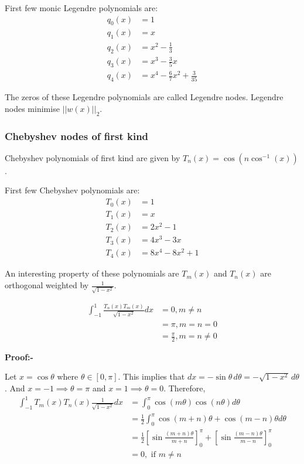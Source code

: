 \documentclass[
]{book}
\begin{document}
First few monic Legendre polynomials are:
\begin{align*}
  q_0(x) &= 1\\
  q_1(x) &= x\\
  q_2(x) &= x^2-\frac{1}{3}\\
  q_3(x) &= x^3-\frac{3}{5}x\\
  q_4(x) &= x^4- \frac{6}{7}x^2+\frac{3}{35}
\end{align*}

The zeros of these Legendre polynomials are called Legendre nodes. Legendre nodes minimise \(||w(x)||_2\).

\hypertarget{chebyshev-nodes-of-first-kind}{%
\subsubsection{Chebyshev nodes of first kind}\label{chebyshev-nodes-of-first-kind}}

Chebyshev polynomials of first kind are given by \(T_n(x) = \cos(n\cos^{-1}(x))\).

First few Chebyshev polynomials are:
\begin{align}
T_0(x) &= 1\\
T_1(x) &= x\\
T_2(x) &= 2x^2-1\\
T_3(x) &= 4x^3-3x\\
T_4(x) &= 8x^4-8x^2+1
\end{align}

An interesting property of these polynomials are \(T_m(x)\) and \(T_n(x)\) are orthogonal weighted by \(\frac{1}{\sqrt{1-x^2}}\).

\begin{align}
   \int_{-1}^{1}\frac{ T_n(x)T_m(x)}{\sqrt{1-x^2}}dx &= 0 , m \neq n\\
                                    &= \pi,m = n= 0\\
                                    &= \frac{\pi}{2}, m = n \neq 0               
\end{align}

\textbf{Proof:-}

Let \(x = \cos \theta\) where \(\theta \in [0,\pi]\). This implies that \(dx = -\sin \theta \, d \theta = -\sqrt{1-x^2} \, d \theta\). And \(x=-1 \implies \theta = \pi\) and \(x =1 \implies \theta = 0\). Therefore,
\begin{align*}
\int_{-1}^{1} T_m(x)T_n(x) \frac{1}{\sqrt{1-x^2}} dx & = \int_{0}^{\pi} \cos(m\theta) \cos(n\theta) d\theta \\
&= \frac{1}{2}{\int_{0}^{\pi}} \cos(m+n)\theta 
+ \cos(m-n)\theta d\theta  \\
&=\frac{1}{2} \left[\sin\frac{(m+n)\theta }{m+n}\right]_{0}^{\pi}
+ \left[\sin\frac{(m-n)\theta }{m-n}\right]_{0}^{\pi}\\
&= 0, \text{ if } m \neq n 
\end{align*}
\end{document}

